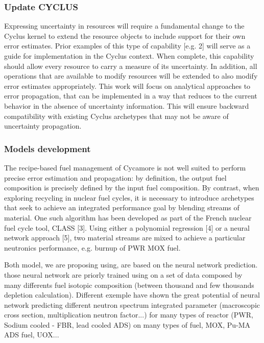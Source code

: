 \documentclass[dvips,12pt]{article}
\begin{document}
\subsubsection{Update CYCLUS}%
Expressing uncertainty in resources will require a fundamental change to the Cyclus kernel to extend the resource objects to include support for their own error estimates.  Prior examples of this type of capability [e.g. 2] will serve as a guide for implementation in the Cyclus context.  When complete, this capability should allow every resource to carry a measure of its uncertainty.  In addition, all operations that are available to modify resources will be extended to also modify error estimates appropriately. This work will focus on analytical approaches to error propagation,  that can be implemented in a way that reduces to the current behavior in the absence of uncertainty information. This will ensure backward compatibility with existing Cyclus archetypes that may not be aware of uncertainty propagation.

\subsubsection{Models development}
The recipe-based fuel management of Cycamore is not well suited to perform precise error estimation and propagation: by definition, the output fuel composition is precisely defined by the input fuel composition.   By contrast, when exploring recycling in nuclear fuel cycles, it is necessary to introduce archetypes that seek to achieve an integrated performance goal by blending streams of material.  One such algorithm has been developed as part of the French nuclear fuel cycle tool, CLASS [3].  Using either a polynomial regression [4] or a neural network approach [5], two material streams are mixed to achieve a particular neutronics performance, e.g. burnup of PWR MOX fuel.
	
	
Both model, we are proposing using, are based on the neural network prediction. those neural network are priorly trained using on a set of data composed by many differents fuel isotopic composition (between thousand and few thousands depletion calculation).
Different exemple have shown the great potential of neural network predicting different neutron spectrum integrated parameter (macroscopic cross section, multiplication neutron factor...) for many types of reactor (PWR, Sodium cooled - FBR,  lead cooled ADS) on many types of fuel, MOX, Pu-MA ADS fuel, UOX...\\
\end{document}
